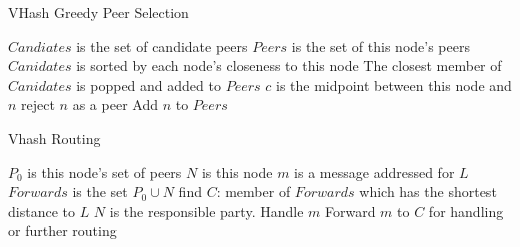 \documentclass{article}
\begin{document}
\begin{algorithm}[H]
\footnotesize{
\caption{VHash Greedy Peer Selection}
\label{peer}
\begin{algorithmic}[1]  %
	\STATE $Candiates$ is the set of candidate peers
    \STATE $Peers$ is the set of this node's peers
    \STATE $Canidates$ is sorted by each node's closeness to this node
    \STATE The closest member of $Canidates$ is popped and added to $Peers$
    	\STATE $c$ is the midpoint between this node and $n$
        	\STATE reject $n$ as a peer
        \ELSE
        	\STATE Add $n$ to $Peers$
        \ENDIF
    \ENDFOR
\end{algorithmic}
}
\end{algorithm}

\begin{algorithm}[H]
\footnotesize{
\caption{Vhash Routing}
\label{routing}
\begin{algorithmic}[1]  %
	\STATE $P_0$ is this node's set of peers
    \STATE $N$ is this node
	\STATE $m$ is a message addressed for $L$
    \STATE $Forwards$ is the set $P_0\cup{}N$
    \STATE find $C$: member of $Forwards$ which has the shortest distance to $L$
    	\STATE $N$ is the responsible party.
        \STATE Handle $m$
    \ELSE
    	\STATE Forward $m$ to $C$ for handling or further routing
    \ENDIF
\end{algorithmic}
}
\end{algorithm}

{\footnotesize


}
\end{document}

